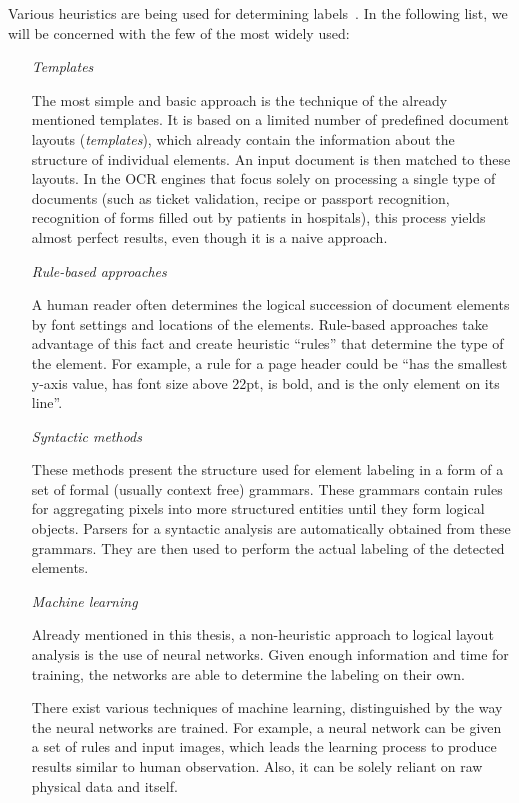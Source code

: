 Various heuristics are being used for determining labels~\cite{logicalLayoutTemplate}. In the following list, we will be concerned with the few of the most widely used:

\begin{itemize}
\item[\emph{Templates}]

The most simple and basic approach is the technique of the already mentioned templates. It is based on a limited number of predefined document layouts (\emph{templates}), which already contain the information about the structure of individual elements. An input document is then matched to these layouts. In the OCR engines that focus solely on processing a single type of documents (such as ticket validation, recipe or passport recognition, recognition of forms filled out by patients in hospitals), this process yields almost perfect results, even though it is a naive approach.

\item[\emph{Rule-based approaches}]

A human reader often determines the logical succession of document elements by font settings and locations of the elements. Rule-based approaches take advantage of this fact and create heuristic ``rules'' that determine the type of the element. For example, a rule for a page header could be ``has the smallest y-axis value, has font size above 22pt, is bold, and is the only element on its line''.

\item[\emph{Syntactic methods}]

These methods present the structure used for element labeling in a form of a set of formal (usually context free) grammars. These grammars contain rules for aggregating pixels into more structured entities until they form logical objects. Parsers for a syntactic analysis are automatically obtained from these grammars. They are then used to perform the actual labeling of the detected elements.

\item[\emph{Machine learning}]

Already mentioned in this thesis, a non-heuristic approach to logical layout analysis is the use of neural networks. Given enough information and time for training, the networks are able to determine the labeling on their own.

There exist various techniques of machine learning, distinguished by the way the neural networks are trained. For example, a neural network can be given a set of rules and input images, which leads the learning process to produce results similar to human observation. Also, it can be solely reliant on raw physical data and itself.

\end{itemize}


